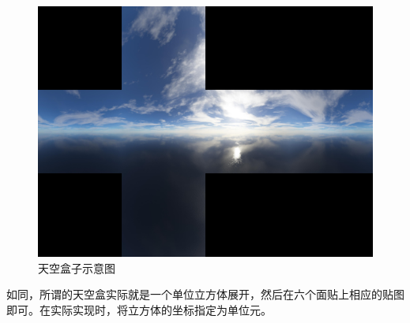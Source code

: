      \begin{figure}[H]
    	\centering
		\includegraphics[width=1.0\textwidth]{images/skybox.jpeg}
		\caption{天空盒子示意图}
		\label{skybox}
    \end{figure}
                \begin{spacing}{2.5}
                	    如同，所谓的天空盒实际就是一个单位立方体展开，然后在六个面贴上相应的贴图即可。在实际实现时，将立方体的坐标指定为单位元。
                \end{spacing}


    
    

